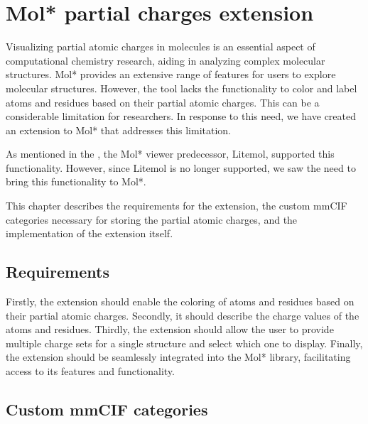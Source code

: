 \documentclass[
  digital,     %
  oneside,     %
  nosansbold,  %
  nocolorbold, %
  lof,         %
  lot,         %
]{fithesis4}
\begin{document}
\newpage
\chapter{Mol* partial charges extension}
\label{chapter:molstar_partial_charges_extension}

Visualizing partial atomic charges in molecules is an essential aspect of computational chemistry research, aiding in analyzing complex molecular structures. Mol* provides an extensive range of features for users to explore molecular structures. However, the tool lacks the functionality to color and label atoms and residues based on their partial atomic charges.
This can be a considerable limitation for researchers. In response to this need, we have created an extension to Mol* that addresses this limitation.

As mentioned in the , the Mol* viewer predecessor, Litemol, supported this functionality. However, since Litemol is no longer supported, we saw the need to bring this functionality to Mol*.

This chapter describes the requirements for the extension, the custom mmCIF categories necessary for storing the partial atomic charges, and the implementation of the extension itself.

\section{Requirements}
\label{section:requirements}


Firstly, the extension should enable the coloring of atoms and residues based on their partial atomic charges. Secondly, it should describe the charge values of the atoms and residues. Thirdly, the extension should allow the user to provide multiple charge sets for a single structure and select which one to display. Finally, the extension should be seamlessly integrated into the Mol* library, facilitating access to its features and functionality.

\section{Custom mmCIF categories}
\label{section:custom_mmcif_categories}
\end{document}
